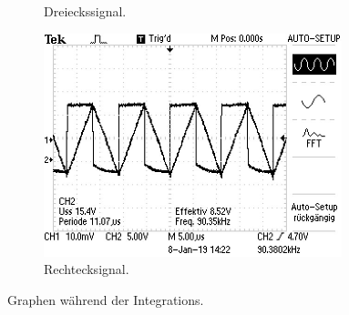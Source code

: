 \begin{figure}
\begin{subfigure}{0.32\textwidth}
        \caption{Dreieckssignal.}
        \label{fig:dreieck}
    \end{subfigure}
    \begin{subfigure}{0.32\textwidth}
        \centering
        \includegraphics[width=0.95\textwidth]{content/rechteck.jpg}
        \caption{Rechtecksignal.}
        \label{fig:rechteck}
    \end{subfigure}
    \caption{Graphen während der Integrations.}
    \label{fig:integration}
\end{figure}